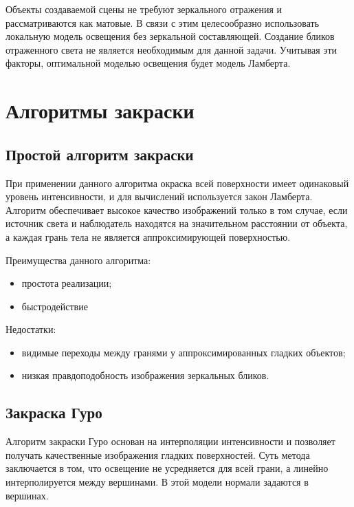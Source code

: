 Объекты создаваемой сцены не требуют зеркального отражения и рассматриваются как матовые. В связи с этим целесообразно использовать локальную модель освещения без зеркальной составляющей. Создание бликов отраженного света не является необходимым для данной задачи. Учитывая эти факторы, оптимальной моделью освещения будет модель Ламберта.

\section{Алгоритмы закраски}

\subsection{Простой алгоритм закраски}

При применении данного алгоритма окраска всей поверхности имеет одинаковый уровень интенсивности, и для вычислений используется закон Ламберта. Алгоритм обеспечивает высокое качество изображений только в том случае, если источник света и наблюдатель находятся на значительном расстоянии от объекта, а каждая грань тела не является аппроксимирующей поверхностью.

Преимущества данного алгоритма:

\begin{itemize}
	\item простота реализации;
	\item быстродействие
\end{itemize}

Недостатки:

\begin{itemize}
	\item видимые переходы между гранями у аппроксимированных гладких объектов;
	\item низкая правдоподобность изображения зеркальных бликов.
	
\end{itemize}

\subsection{Закраска Гуро}

Алгоритм закраски Гуро основан на интерполяции интенсивности и позволяет получать качественные изображения гладких поверхностей. Суть метода заключается в том, что освещение не усредняется для всей грани, а линейно интерполируется между вершинами. В этой модели нормали задаются в вершинах.


